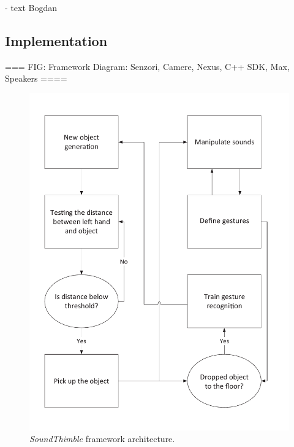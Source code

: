 \documentclass{nime-alternate}
\begin{document}
- text Bogdan

\subsection{Implementation}

=== FIG: Framework Diagram: Senzori, Camere, Nexus, C++ SDK, Max, Speakers ====




\begin{figure}[t]
	\centering
	\includegraphics[width=.8\columnwidth]{img/concept}
	\caption{\textit{SoundThimble} framework architecture.}
	\label{fig:archi}
\end{figure}
\end{document}
